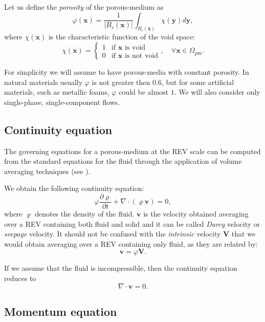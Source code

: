 Let us define the \emph{porosity} of the porous-medium as
\begin{equation}
\varphi(\mathbf{x}) = \frac{1}{|B_r(\mathbf{x})|} \int_{B_r(\mathbf{x})} \chi 
(\mathbf{y}) d\mathbf{y},
\end{equation}
where $\chi(\mathbf{x})$ is the characteristic function of the void space:
\begin{equation}
\chi(\mathbf{x}) =
\begin{cases}
1 &\text{if $\mathbf{x}$ is void}\\
0 &\text{if $\mathbf{x}$ is not void}
\end{cases}, \quad \forall \mathbf{x} \in \Omega_\text{pm}.
\end{equation}

For simplicity we will assume to have porous-media with constant porosity. In 
natural materials usually $\varphi$ is not greater then $0.6$, but for some 
artificial materials, such as metallic foams, $\varphi$ could be almost $1$.
We will also consider only single-phase, single-component flows.
%
\subsection{Continuity equation}
The governing equations for a porous-medium at the REV scale can be computed 
from the standard equations for the fluid through the application of volume 
averaging techniques (see \cite{volaver:withakerbook}).

We obtain the following continuity equation:
\begin{equation}
\varphi\frac{\partial \varrho}{\partial t} + \nabla \cdot (\varrho 
\mathbf{v}) = 0,
\end{equation}
where $\varrho$ denotes the density of the fluid. $\mathbf{v}$ is the velocity 
obtained averaging over a REV containing both fluid and solid and it can be 
called \emph{Darcy} velocity or \emph{seepage} velocity. It should not be 
confused with the \emph{intrinsic} velocity $\mathbf{V}$ that we would obtain 
averaging over a REV containing only fluid, as they are related by:
\begin{equation}
	\mathbf{v} = \varphi \mathbf{V}.
\end{equation}

If we assume that the fluid is incompressible, then the continuity equation 
reduces to
\begin{equation} \label{eq:pmcontinuity}
\nabla \cdot \mathbf{v} = 0.
\end{equation}
%
\subsection{Momentum equation}
